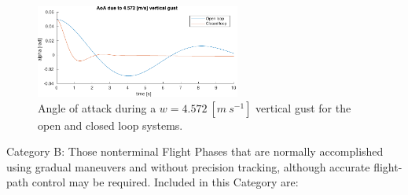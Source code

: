 \begin{figure}[ht]
    \centering
    \includegraphics[width=0.6\textwidth]{figures/pc_vertgust.pdf}    
    \caption{Angle of attack during a $w=4.572\ [m\ s^{-1}]$ vertical gust for the open and closed loop systems.}
    \label{fig:pc_vertgust}
\end{figure}

Category B: Those nonterminal Flight Phases that are normally accomplished using
gradual maneuvers and without precision tracking, although accurate
flight-path control may be required. Included in this Category are:


\clearpage
